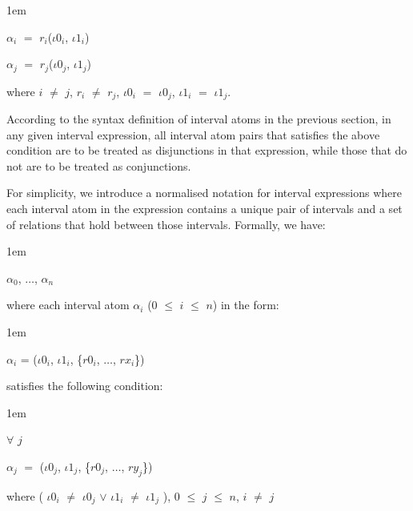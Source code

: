 \documentclass[11pt]{report}
\newenvironment{vquote}
{
  \begin{list}{}{\leftmargin 1em}\item[]
}
{
  \end{list}
}
\begin{document}
\begin{itemize}
              \begin{vquote}
                ${\alpha}_i$ $=$ $r_i$(${\iota}0_i$, ${\iota}1_i$) 

                ${\alpha}_j$ $=$ $r_j$(${\iota}0_j$, ${\iota}1_j$)

                where
                $i$ $\neq$ $j$,
                $r_i$ $\neq$ $r_j$,
                ${\iota}0_i$ $=$ ${\iota}0_j$,
                ${\iota}1_i$ $=$ ${\iota}1_j$.
              \end{vquote}

              According to the syntax definition of interval atoms in the
              previous section, in any given interval expression, all interval
              atom pairs that satisfies the above condition are to be treated
              as disjunctions in that expression, while those that do not are
              to be treated as conjunctions.

              For simplicity, we introduce a normalised notation for interval
              expressions where each interval atom in the expression contains a 
              unique pair of intervals and a set of relations that hold between
              those intervals. Formally, we have:

              \begin{vquote}
                ${\alpha}_0$, $\ldots$, ${\alpha}_n$
              \end{vquote}

              \noindent
              where each interval atom ${\alpha}_i$ ($0$ $\leq$ $i$ $\leq$ $n$)
              in the form:

              \begin{vquote}
                ${\alpha}_i$ =
                  (${\iota}0_i$, ${\iota}1_i$, \{$r0_i$, $\ldots$, $rx_i$\})
              \end{vquote}

              \noindent
              satisfies the following condition:

              \begin{vquote}
                $\forall$ $j$

                ${\alpha}_j$ $=$ 
                  (${\iota}0_j$, ${\iota}1_j$, \{$r0_j$, $\ldots$, $ry_j$\})

                where 
                (
                  ${\iota}0_i$ $\neq$ ${\iota}0_j$ $\lor$
                  ${\iota}1_i$ $\neq$ ${\iota}1_j$
                ),
                $0$ $\leq$ $j$ $\leq$ $n$,
                $i$ $\neq$ $j$
              \end{vquote}


\end{itemize}
\end{document}
